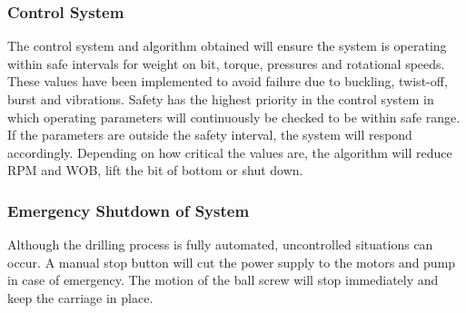 \subsubsection{Control System}
The control system and algorithm obtained will ensure the system is operating within safe intervals for weight on bit, torque, pressures and rotational speeds. These values have been implemented to avoid failure due to buckling, twist-off, burst and vibrations. Safety has the highest priority in the control system in which operating parameters will continuously be checked to be within safe range. If the parameters are outside the safety interval, the system will respond accordingly. Depending on how critical the values are, the algorithm will reduce RPM and WOB, lift the bit of bottom or shut down. 


\subsubsection{Emergency Shutdown of System}
Although the drilling process is fully automated, uncontrolled situations can occur. A manual stop button will cut the power supply to the motors and pump in case of emergency. The motion of the ball screw will stop immediately and keep the carriage in place. 